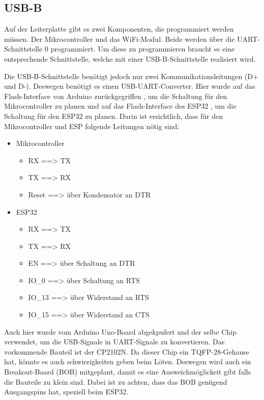 \subsection{USB-B}
\label{subsec:USB-B}

Auf der Leiterplatte gibt es zwei Komponenten, die programmiert werden müssen. Der Mikrocontroller und das WiFi-Modul. Beide werden über die UART-Schnittstelle 0 programmiert. Um diese zu programmieren braucht es eine entsprechende Schnittstelle, welche mit einer USB-B-Schnittstelle realisiert wird.

Die USB-B-Schnittstelle benötigt jedoch nur zwei Kommunikationsleitungen (D+ und D-). Deswegen benötigt es einen USB-UART-Converter. Hier wurde auf das Flash-Interface von Arduino zurückgegriffen \cite{arduino_cc_arduino_2017}, um die Schaltung für den Mikrocontroller zu planen und auf das Flash-Interface des ESP32 \cite{espressif_systems_esp32_2016}, um die Schaltung für den ESP32 zu planen. Darin ist ersichtlich, dass für den Mikrocontroller und ESP folgende Leitungen nötig sind:

\begin{itemize}
\item Mikrocontroller
\begin{itemize}
\item RX ==> TX
\item TX ==> RX
\item Reset ==> über Kondensator an DTR
\end{itemize}
\item ESP32
\begin{itemize}
\item RX ==> TX
\item TX ==> RX
\item EN ==> über Schaltung an DTR
\item IO\_0 ==> über Schaltung an RTS
\item IO\_13 ==> über Widerstand an RTS
\item IO\_15 ==> über Widerstand an CTS
\end{itemize}
\end{itemize}

Auch hier wurde vom Arduino Uno-Board abgekpufert und der selbe Chip verwendet, um die USB-Signale in UART-Signale zu konvertieren. Das vorkommende Bauteil ist der CP2102N. Da dieser Chip ein TQFP-28-Gehause hat, könnte es auch schwierigkeiten geben beim Löten. Deswegen wird auch ein Breakout-Board (BOB) mitgeplant, damit es eine Ausweichmöglickeit gibt falls die Bauteile zu klein sind. Dabei ist zu achten, dass das BOB genügend Ausgangspins hat, speziell beim ESP32.

